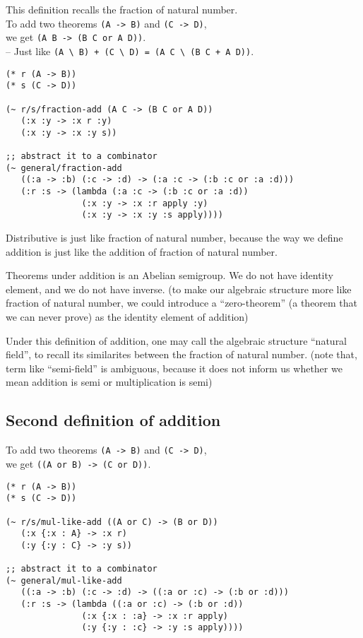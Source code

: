 \documentclass[numbers]{sigplanconf}
\begin{document}
This definition recalls the fraction of natural number. \\
To add two theorems {\scriptsize\verb|(A -> B)|} and {\scriptsize\verb|(C -> D)|}, \\
we get {\scriptsize\verb|(A B -> (B C or A D))|}. \\
-- Just like {\scriptsize\verb|(A \ B) + (C \ D) = (A C \ (B C + A D))|}.

{\scriptsize\begin{verbatim}
(* r (A -> B))
(* s (C -> D))

(~ r/s/fraction-add (A C -> (B C or A D))
   (:x :y -> :x r :y)
   (:x :y -> :x :y s))

;; abstract it to a combinator
(~ general/fraction-add
   ((:a -> :b) (:c -> :d) -> (:a :c -> (:b :c or :a :d)))
   (:r :s -> (lambda (:a :c -> (:b :c or :a :d))
               (:x :y -> :x :r apply :y)
               (:x :y -> :x :y :s apply))))
\end{verbatim}}

Distributive is just like fraction of natural number,
because the way we define addition
is just like the addition of fraction of natural number.

Theorems under addition is an Abelian semigroup.
We do not have identity element,
and we do not have inverse.
(to make our algebraic structure more like fraction of natural number,
we could introduce a ``zero-theorem''
(a theorem that we can never prove)
as the identity element of addition)

Under this definition of addition,
one may call the algebraic structure ``natural field'',
to recall its similarites between the fraction of natural number.
(note that, term like ``semi-field'' is ambiguous,
because it does not inform us
whether we mean addition is semi or multiplication is semi)

\subsection{Second definition of addition}

To add two theorems {\scriptsize\verb|(A -> B)|} and {\scriptsize\verb|(C -> D)|}, \\
we get {\scriptsize\verb|((A or B) -> (C or D))|}.

{\scriptsize\begin{verbatim}
(* r (A -> B))
(* s (C -> D))

(~ r/s/mul-like-add ((A or C) -> (B or D))
   (:x {:x : A} -> :x r)
   (:y {:y : C} -> :y s))

;; abstract it to a combinator
(~ general/mul-like-add
   ((:a -> :b) (:c -> :d) -> ((:a or :c) -> (:b or :d)))
   (:r :s -> (lambda ((:a or :c) -> (:b or :d))
               (:x {:x : :a} -> :x :r apply)
               (:y {:y : :c} -> :y :s apply))))
\end{verbatim}}
\end{document}
